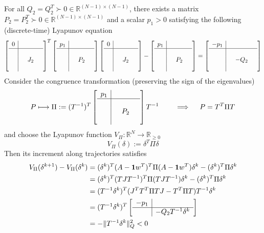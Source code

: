 \documentclass{book}
\newcommand{\R}{\mathbb{R}}
\theoremstyle{theoremv2}
\theoremstyle{defv2}
\theoremstyle{remark}
\theoremstyle{remark}
\theoremstyle{definition}
\theoremstyle{definition}
\begin{document}
For all $Q_2=Q_2^T \succ 0 \in\R^{(N-1)\times(N-1)}$, there exists a matrix $P_2=P_2^T \succ 0 \in\R^{(N-1)\times(N-1)}$ and a scalar $p_1>0$ satisfying the following (discrete-time) Lyapunov equation
\[
    \left[\begin{array}{c| c c c }
        0 & & & \\ \hline \\ & & J_2 & \\ & & & 
    \end{array}\right]^T \left[\begin{array}{c| c c c }
        p_1 & & & \\ \hline \\ & & P_2 & \\ & & & 
    \end{array}\right] \left[\begin{array}{c| c c c }
        0 & & & \\ \hline \\ & & J_2 & \\ & & & 
    \end{array}\right] - \left[\begin{array}{c| c c c }
        p_1 & & & \\ \hline \\ & & P_2 & \\ & & & 
    \end{array}\right] = \left[\begin{array}{c| c c c }
        -p_1 & & & \\ \hline \\ & & -Q_2 & \\ & & & 
    \end{array}\right]
\]
Consider the congruence transformation (preserving the sign of the eigenvalues)
\[
    P \longmapsto \Pi := (T^{-1})^T \left[\begin{array}{c| c c c }
        p_1 & & & \\ \hline \\ & & P_2 & \\ & & & 
    \end{array}\right] T^{-1} \qquad \implies \quad P = T^T\Pi T
\]
and choose the Lyapunov function $V_\Pi:\R^N\to \R_{\geq0}$ 
\[
    V_\Pi(\delta) := \delta^T\Pi\delta
\]
Then its increment along trajectories satisfies
\begin{align*}
    V_\Pi(\delta^{k+1})-V_\Pi(\delta^k) &= (\delta^k)^T(A-\boldsymbol{1}w^T)^T\Pi(A-\boldsymbol{1}w^T)\delta^k-(\delta^k)^T\Pi\delta^k \\
    &= (\delta^k)^T(TJT^{-1})^T\Pi(TJT^{-1})\delta^k - (\delta^k)^T\Pi\delta^k \\ 
    &= (T^{-1}\delta^k)^T(J^TT^T\Pi TJ-T^T\Pi T)T^{-1}\delta^k \\ 
    &= (T^{-1}\delta^k)^T \left[\begin{array}{c|c}
        -p_1 & \\ \hline & -Q_2 T^{-1}\delta^k
    \end{array}\right] \\ 
    &= -\|T^{-1}\delta^k\|^2_Q < 0
\end{align*}
\end{document}
